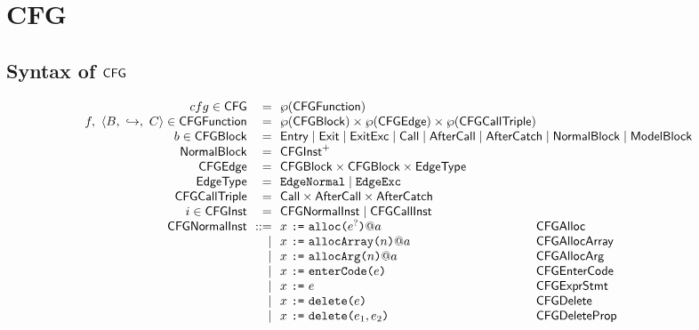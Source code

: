 \chapter{CFG}


\section{Syntax of $\mbox{\textsf{CFG}}$}
\[
\begin{array}{r@{~~}r@{~~}l@{}ll}
cfg \in \CFG & = & \powerset{\CFGFunction} & \\
f,\ \langle B,\ \hookrightarrow,\ C \rangle \in \CFGFunction & = & \powerset{\CFGBlock} \times \powerset{\CFGEdge} \times \powerset{\CFGCallTriple} & \\
b \in \CFGBlock & = & \multicolumn{2}{@{}l}{\Entry \mid \Exit \mid \ExitExc \mid \Call \mid \AfterCall \mid \AfterCatch \mid \NormalBlock \mid \ModelBlock} \\
\NormalBlock & = & \CFGInst^+ & \\
\CFGEdge & = & \CFGBlock \times \CFGBlock \times \EdgeType & \\
\EdgeType & = & \EdgeNormal \mid \EdgeExc & \\
\CFGCallTriple & = & \Call \times \AfterCall \times \AfterCatch & \\

i \in \CFGInst & = & \CFGNormalInst \mid \CFGCallInst &
\\

\CFGNormalInst & ::= &
x~\verb+:=+~\TT{alloc}\verb+(+ e^{?} \verb+)+ @ a
& \SF{CFGAlloc}
\\

& \mid & x~\verb+:=+~\TT{allocArray}\verb+(+n\verb+)+ @ a
 & \SF{CFGAllocArray}
\\

& \mid & x~\verb+:=+~\TT{allocArg}\verb+(+n\verb+)+ @ a
 & \SF{CFGAllocArg}
\\

& \mid & x~\verb+:=+~\TT{enterCode}\verb+(+e\verb+)+
 & \SF{CFGEnterCode}
\\

& \mid & x ~\verb+:=+~ e
 & \SF{CFGExprStmt}
\\

& \mid & x ~\verb+:=+~ \TT{delete}\verb+(+e\verb+)+
 & \SF{CFGDelete}
\\

& \mid & x ~\verb+:=+~ \TT{delete}\verb+(+e_1,e_2\verb+)+
 & \SF{CFGDeleteProp}
\\


\end{array}\]
